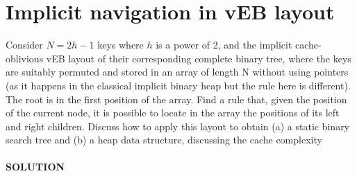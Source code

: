 \documentclass[a4paper]{article}
\begin{document}
\section*{Implicit navigation in vEB layout}
Consider $N = 2h − 1$ keys where $h$ is a power of 2,
and the implicit cache-oblivious vEB layout of their corresponding complete binary
tree, where the keys are suitably permuted and stored in an array of length N without
using pointers (as it happens in the classical implicit binary heap but the rule here
is different). The root is in the first position of the array. Find a rule that, given the
position of the current node, it is possible to locate in the array the positions of its
left and right children. Discuss how to apply this layout to obtain (a) a static binary
search tree and (b) a heap data structure, discussing the cache complexity
\\
\\
\textbf{SOLUTION}
\\
\\
\end{document}
